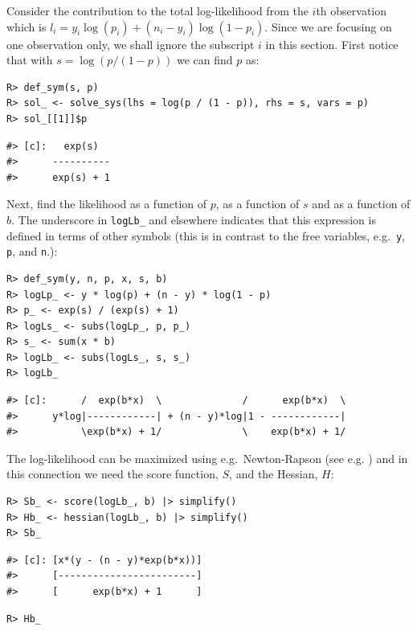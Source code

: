Consider the contribution to the total log-likelihood from the \(i\)th
observation which is \(l_i = y_i \log(p_i) + (n_i-y_i) \log(1-p_i)\).
Since we are focusing on one observation only, we shall ignore the
subscript \(i\) in this section. First notice that with
\(s = \log(p/(1-p))\) we can find \(p\) as:

\begin{verbatim}
R> def_sym(s, p)
R> sol_ <- solve_sys(lhs = log(p / (1 - p)), rhs = s, vars = p)
R> sol_[[1]]$p
\end{verbatim}

\begin{verbatim}
#> [c]:   exp(s)  
#>      ----------
#>      exp(s) + 1
\end{verbatim}

Next, find the likelihood as a function of \(p\), as a function of \(s\) and as a function of \(b\).
The underscore in \texttt{logLb\_} and elsewhere indicates that this expression
is defined in terms of other symbols (this is in contrast
to the free variables, e.g.~\texttt{y}, \texttt{p}, and \texttt{n}.):

\begin{verbatim}
R> def_sym(y, n, p, x, s, b)
R> logLp_ <- y * log(p) + (n - y) * log(1 - p)
R> p_ <- exp(s) / (exp(s) + 1)
R> logLs_ <- subs(logLp_, p, p_)
R> s_ <- sum(x * b)
R> logLb_ <- subs(logLs_, s, s_)
R> logLb_
\end{verbatim}

\begin{verbatim}
#> [c]:      /  exp(b*x)  \              /      exp(b*x)  \
#>      y*log|------------| + (n - y)*log|1 - ------------|
#>           \exp(b*x) + 1/              \    exp(b*x) + 1/
\end{verbatim}

The log-likelihood can be maximized using e.g.~Newton-Rapson (see e.g. \cite{nocedal}) and in this connection we
need the score function, \(S\), and the Hessian, \(H\):

\begin{verbatim}
R> Sb_ <- score(logLb_, b) |> simplify()
R> Hb_ <- hessian(logLb_, b) |> simplify()
R> Sb_
\end{verbatim}

\begin{verbatim}
#> [c]: [x*(y - (n - y)*exp(b*x))]
#>      [------------------------]
#>      [      exp(b*x) + 1      ]
\end{verbatim}

\begin{verbatim}
R> Hb_
\end{verbatim}

